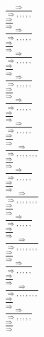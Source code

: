 \documentclass[11pt]{article}
\begin{document}
\begin{center}
\bigskip
\\$\frac{\Rightarrow }{\Rightarrow , , , , , }$
\bigskip
\\$\frac{\Rightarrow }{\Rightarrow }$
\bigskip
\\$\frac{\Rightarrow }{\Rightarrow , , , , , }$
\bigskip
\\$\frac{\Rightarrow }{\Rightarrow }$
\bigskip
\\$\frac{\Rightarrow }{\Rightarrow , , , , , }$
\bigskip
\\$\frac{\Rightarrow }{\Rightarrow }$
\bigskip
\\$\frac{\Rightarrow }{\Rightarrow , , , , , }$
\bigskip
\\$\frac{\Rightarrow }{\Rightarrow }$
\bigskip
\\$\frac{\Rightarrow }{\Rightarrow , , , , , }$
\bigskip
\\$\frac{\Rightarrow }{\Rightarrow }$
\bigskip
\\$\frac{\Rightarrow }{\Rightarrow , , , , , }$
\bigskip
\\$\frac{\Rightarrow }{\Rightarrow }$
\bigskip
\\$\frac{\Rightarrow }{\Rightarrow , , , , , , , }$
\bigskip
\\$\frac{\Rightarrow }{\Rightarrow }$
\bigskip
\\$\frac{\Rightarrow }{\Rightarrow , , , , , }$
\bigskip
\\$\frac{\Rightarrow }{\Rightarrow }$
\bigskip
\\$\frac{\Rightarrow }{\Rightarrow , , , , , , , }$
\bigskip
\\$\frac{\Rightarrow }{\Rightarrow }$
\bigskip
\\$\frac{\Rightarrow }{\Rightarrow , , , , , }$
\bigskip
\\$\frac{\Rightarrow }{\Rightarrow }$
\bigskip
\\$\frac{\Rightarrow }{\Rightarrow , , , , , , , }$
\bigskip
\\$\frac{\Rightarrow }{\Rightarrow }$
\bigskip
\\$\frac{\Rightarrow }{\Rightarrow , , , , , }$
\bigskip
\\$\frac{\Rightarrow }{\Rightarrow }$
\bigskip
\\$\frac{\Rightarrow }{\Rightarrow , , , , , , , }$
\bigskip
\\$\frac{\Rightarrow }{\Rightarrow }$
\bigskip
\\$\frac{\Rightarrow }{\Rightarrow , , , , , }$
\bigskip
\\$\frac{\Rightarrow }{\Rightarrow }$
\bigskip

\end{center}
\end{document}
